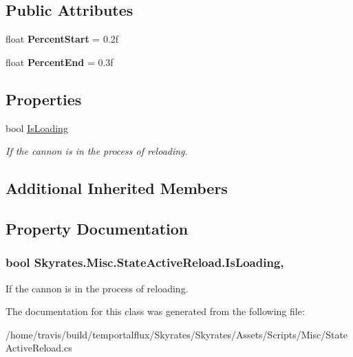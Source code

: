 \subsection*{Public Attributes}
\begin{DoxyCompactItemize}
\item 
\hypertarget{class_skyrates_1_1_misc_1_1_state_active_reload_a29da13bb99b03a8bd17d2a9c2904bb92}{float {\bfseries Percent\-Start} = 0.\-2f}\label{class_skyrates_1_1_misc_1_1_state_active_reload_a29da13bb99b03a8bd17d2a9c2904bb92}

\item 
\hypertarget{class_skyrates_1_1_misc_1_1_state_active_reload_a9404369eee4ad0ec9bc1722158691f58}{float {\bfseries Percent\-End} = 0.\-3f}\label{class_skyrates_1_1_misc_1_1_state_active_reload_a9404369eee4ad0ec9bc1722158691f58}

\end{DoxyCompactItemize}
\subsection*{Properties}
\begin{DoxyCompactItemize}
\item 
bool \hyperlink{class_skyrates_1_1_misc_1_1_state_active_reload_a09cc8e5f1d0601ab3649537ffc802d13}{Is\-Loading}
\begin{DoxyCompactList}\small\item\em If the cannon is in the process of reloading. \end{DoxyCompactList}\end{DoxyCompactItemize}
\subsection*{Additional Inherited Members}


\subsection{Property Documentation}
\hypertarget{class_skyrates_1_1_misc_1_1_state_active_reload_a09cc8e5f1d0601ab3649537ffc802d13}{
\subsubsection[{Is\-Loading}]{\setlength{\rightskip}{0pt plus 5cm}bool Skyrates.\-Misc.\-State\-Active\-Reload.\-Is\-Loading\hspace{0.3cm}{\ttfamily [get]}, {\ttfamily [set]}}}\label{class_skyrates_1_1_misc_1_1_state_active_reload_a09cc8e5f1d0601ab3649537ffc802d13}


If the cannon is in the process of reloading. 



The documentation for this class was generated from the following file\-:\begin{DoxyCompactItemize}
\item 
/home/travis/build/temportalflux/\-Skyrates/\-Skyrates/\-Assets/\-Scripts/\-Misc/State\-Active\-Reload.\-cs\end{DoxyCompactItemize}
